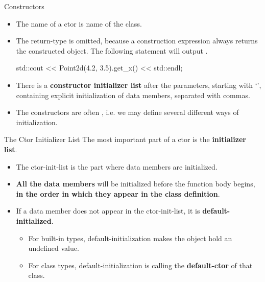 \documentclass{beamer}
\begin{document}
\begin{frame}[fragile]{Constructors}
    \begin{itemize}
        \item The name of a ctor is name of the class.
        \item The return-type is omitted, because a construction expression always returns the constructed object. The following statement will output .
        \begin{cpp}
std::cout << Point2d(4.2, 3.5).get_x() << std::endl;
        \end{cpp}
        \item There is a \textbf{constructor initializer list} after the parameters, starting with `\ttt{:}', containing explicit initialization of  data members, separated with commas.
        \item The constructors are often , i.e. we may define several different ways of initialization.
    \end{itemize}
\end{frame}

\begin{frame}{The Ctor Initializer List}
    The most important part of a ctor is the \textbf{initializer list}.
    \begin{itemize}
        \item The ctor-init-list is the part where data members are initialized.
        \item \textbf{All the data members} will be initialized before the function body begins, \textbf{in the order in which they appear in the class definition}.
        \item If a data member does not appear in the ctor-init-list, it is \textbf{default-initialized}.
        \begin{itemize}
            \item For built-in types, default-initialization makes the object hold an undefined value.
            \item For class types, default-initialization is calling the \textbf{default-ctor} of that class.
        \end{itemize}
    \end{itemize}
\end{frame}
\end{document}
